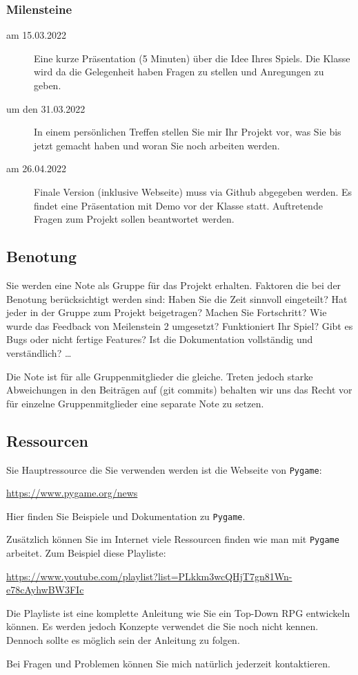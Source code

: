 \documentclass[11pt,a4paper]{report}
\begin{document}
\subsubsection{Milensteine}
\begin{description}
    \item[am 15.03.2022] Eine kurze Präsentation (5 Minuten) über die Idee
        Ihres Spiels. Die Klasse wird da die Gelegenheit haben Fragen zu
        stellen und Anregungen zu geben.
\item[um den 31.03.2022] In einem persönlichen Treffen stellen Sie mir Ihr
    Projekt vor, was Sie bis jetzt gemacht haben und woran Sie noch arbeiten
        werden.
    \item[am 26.04.2022] Finale Version (inklusive Webseite) muss via Github
        abgegeben werden. Es findet eine Präsentation mit Demo vor der Klasse
        statt. Auftretende Fragen zum Projekt sollen beantwortet werden.
\end{description}

\subsection{Benotung}

Sie werden eine Note als Gruppe für das Projekt erhalten. Faktoren die bei der
Benotung berücksichtigt werden sind: Haben Sie die Zeit sinnvoll eingeteilt?
Hat jeder in der Gruppe zum Projekt beigetragen? Machen Sie Fortschritt? Wie
wurde das Feedback von Meilenstein 2 umgesetzt? Funktioniert Ihr Spiel? Gibt es
Bugs oder nicht fertige Features? Ist die Dokumentation vollständig und
verständlich? \dots

Die Note ist für alle Gruppenmitglieder die gleiche. Treten jedoch starke
Abweichungen in den Beiträgen auf (git commits) behalten wir uns das Recht vor
für einzelne Gruppenmitglieder eine separate Note zu setzen.

\newpage

\subsection{Ressourcen}
Sie Hauptressource die Sie verwenden werden ist die Webseite von \verb|Pygame|:
\begin{center}
    \url{https://www.pygame.org/news}
\end{center}

Hier finden Sie Beispiele und Dokumentation zu \verb|Pygame|.

Zusätzlich können Sie im Internet viele Ressourcen finden wie man mit
\verb|Pygame| arbeitet. Zum Beispiel diese Playliste:

\begin{center}
\url{https://www.youtube.com/playlist?list=PLkkm3wcQHjT7gn81Wn-e78cAyhwBW3FIc}
\end{center}

Die Playliste ist eine komplette Anleitung wie Sie ein Top-Down RPG entwickeln
können. Es werden jedoch Konzepte verwendet die Sie noch nicht kennen. Dennoch
sollte es möglich sein der Anleitung zu folgen.

Bei Fragen und Problemen können Sie mich natürlich jederzeit kontaktieren.
\end{document}
